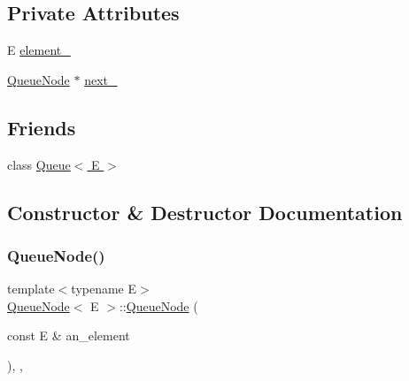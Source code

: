 \subsection*{Private Attributes}
\begin{DoxyCompactItemize}
\item 
E \hyperlink{classQueueNode_a593f0f5862848c1e9063d32ea3438b58}{element\+\_\+}
\item 
\hyperlink{classQueueNode}{Queue\+Node} $\ast$ \hyperlink{classQueueNode_a7434603f6c25418f7810f041752876bd}{next\+\_\+}
\end{DoxyCompactItemize}
\subsection*{Friends}
\begin{DoxyCompactItemize}
\item 
class \hyperlink{classQueueNode_ad4336229b1d7c3626e4ba69f236b202d}{Queue$<$ E $>$}
\end{DoxyCompactItemize}


\subsection{Constructor \& Destructor Documentation}
\mbox{\label{classQueueNode_a2c22feef35d910bec7138598e8784e25}} 
\subsubsection{\texorpdfstring{Queue\+Node()}{QueueNode()}\hspace{0.1cm}{\footnotesize\ttfamily [1/2]}}
{\footnotesize\ttfamily template$<$typename E$>$ \\
\hyperlink{classQueueNode}{Queue\+Node}$<$ E $>$\+::\hyperlink{classQueueNode}{Queue\+Node} (\begin{DoxyParamCaption}\item[{const E \&}]{an\+\_\+element }\end{DoxyParamCaption})\hspace{0.3cm}{\ttfamily [inline]}, {\ttfamily [explicit]}, {\ttfamily [private]}}

\mbox{\label{classQueueNode_a35adcad7a84db46784907cf58106d585}} 
